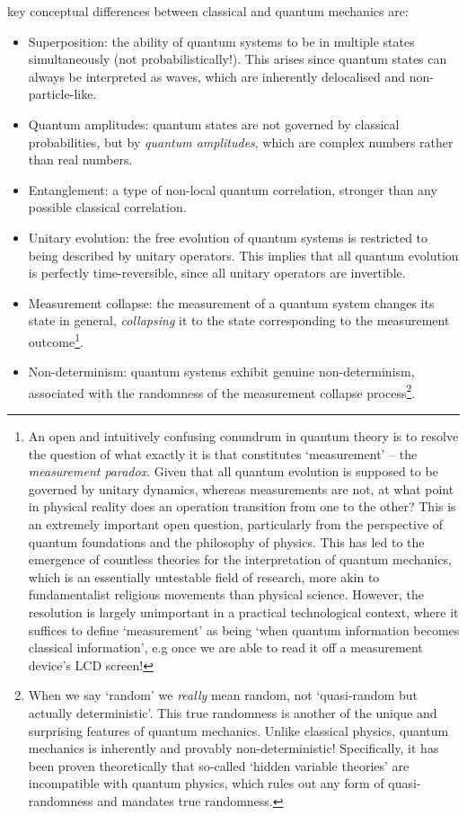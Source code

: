  key conceptual differences between classical and quantum mechanics are:
\begin{itemize}
	\item Superposition: the ability of quantum systems to be in multiple states simultaneously (not probabilistically!). This arises since quantum states can always be interpreted as waves, which are inherently delocalised and non-particle-like.
	\item Quantum amplitudes: quantum states are not governed by classical probabilities, but by \textit{quantum amplitudes}, which are complex numbers rather than real numbers.
	\item Entanglement: a type of non-local quantum correlation, stronger than any possible classical correlation.
	\item Unitary evolution: the free evolution of quantum systems is restricted to being described by unitary operators. This implies that all quantum evolution is perfectly time-reversible, since all unitary operators are invertible.
	\item Measurement collapse: the measurement of a quantum system changes its state in general, \textit{collapsing} it to the state corresponding to the measurement outcome\footnote{An open and intuitively confusing conundrum in quantum theory is to resolve the question of what exactly it is that constitutes `measurement' -- the \textit{measurement paradox}. Given that all quantum evolution is supposed to be governed by unitary dynamics, whereas measurements are not, at what point in physical reality does an operation transition from one to the other? This is an extremely important open question, particularly from the perspective of quantum foundations and the philosophy of physics. This has led to the emergence of countless theories for the interpretation of quantum mechanics, which is an essentially untestable field of research, more akin to fundamentalist religious movements than physical science. However, the resolution is largely unimportant in a practical technological context, where it suffices to define `measurement' as being `when quantum information becomes classical information', e.g once we are able to read it off a measurement device's LCD screen!}.
	\item Non-determinism: quantum systems exhibit genuine non-determinism, associated with the randomness of the measurement collapse process\footnote{When we say `random' we \textit{really} mean random, not `quasi-random but actually deterministic'. This true randomness is another of the unique and surprising features of quantum mechanics. Unlike classical physics, quantum mechanics is inherently and provably non-deterministic! Specifically, it has been proven theoretically \cite{bib:BellNoHiddenVariables} that so-called `hidden variable theories' are incompatible with quantum physics, which rules out any form of quasi-randomness and mandates true randomness.}.
\end{itemize}

